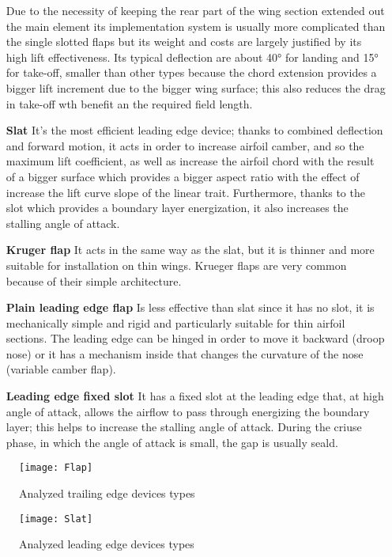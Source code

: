 \begin{itemize}
Due to the necessity of keeping the rear part of the wing section extended out the main element its implementation system is usually more complicated than the single slotted flaps but its weight and costs are largely justified by its high lift effectiveness. Its typical deflection are about 40° for landing and 15° for take-off, smaller than other types because the chord extension provides a bigger lift increment due to the bigger wing surface; this also reduces the drag in take-off wth benefit an the required field length.
\item[\textbf{Slat}]  It's the most efficient leading edge device; thanks to combined deflection and forward motion, it acts in order to increase airfoil camber, and so the maximum lift coefficient, as well as increase the airfoil chord with the result of a bigger surface which provides a bigger aspect ratio with the effect of increase the lift curve slope of the linear trait. Furthermore, thanks to the slot which provides a boundary layer energization, it also increases the stalling angle of attack.
\item[\textbf{Kruger flap}]  It acts in the same way as the slat, but it is thinner and more suitable for installation on thin wings. Krueger flaps are very common because of their simple architecture.
\item[\textbf{Plain leading edge flap}] Is less effective than slat since it has no slot, it is mechanically simple and rigid and particularly suitable for thin airfoil sections. The leading edge can be hinged in order to move it backward (droop nose) or it has a mechanism inside that changes the curvature of the nose (variable camber flap).
\item[\textbf{Leading edge fixed slot}] It has a fixed slot at the leading edge that, at high angle of attack, allows the airflow to pass through energizing the boundary layer; this helps to increase the stalling angle of attack. During the criuse phase, in which the angle of attack is small, the gap is usually seald.
\end{itemize}

\begin{figure}[!t]
  \centering
  \texttt{[image: Flap]}
  \caption{Analyzed trailing edge devices types}
  \label{fig:FlapTypes}
\end{figure}

\begin{figure}[!t]
  \centering
  \texttt{[image: Slat]}
  \caption{Analyzed leading edge devices types}
  \label{fig:SlatTypes}
\end{figure}

